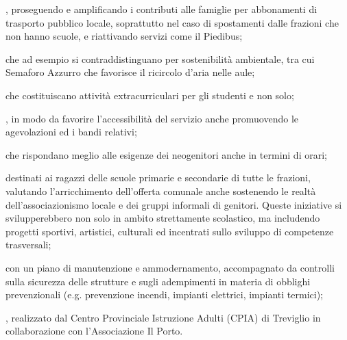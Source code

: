 , proseguendo e amplificando i contributi alle famiglie per abbonamenti di trasporto pubblico locale, soprattutto nel caso di spostamenti dalle frazioni che non hanno scuole, e riattivando servizi come il Piedibus;

 che ad esempio si contraddistinguano per sostenibilità  ambientale, tra cui Semaforo Azzurro che favorisce il ricircolo d'aria nelle aule;

 che costituiscano attività extracurriculari per gli studenti e non solo;

, in modo da favorire l'accessibilità del servizio anche promuovendo le agevolazioni ed i bandi relativi;

 che rispondano meglio alle esigenze dei neogenitori anche in termini di orari;

 destinati ai ragazzi delle scuole primarie e secondarie di tutte le frazioni, valutando l'arricchimento dell'offerta comunale anche sostenendo le realtà dell'associazionismo locale e dei gruppi informali di genitori. Queste iniziative si svilupperebbero non solo in ambito strettamente scolastico, ma includendo progetti sportivi, artistici, culturali ed incentrati sullo sviluppo di competenze trasversali;

 con un piano di manutenzione e ammodernamento, accompagnato da controlli sulla sicurezza delle strutture e sugli adempimenti in materia di obblighi prevenzionali (e.g. prevenzione incendi, impianti elettrici, impianti termici);

, realizzato dal Centro Provinciale Istruzione Adulti (CPIA) di Treviglio in collaborazione con l'Associazione Il Porto. 
